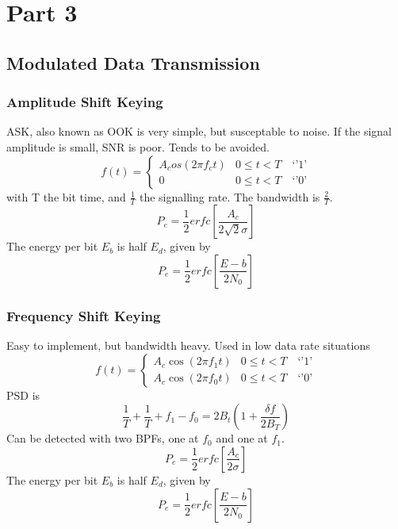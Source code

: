 \documentclass[a4paper,twocolumn]{article}
\begin{document}
	\section{Part 3}
		\subsection{Modulated Data Transmission}
			\subsubsection{Amplitude Shift Keying}
				ASK, also known as OOK is very simple, but susceptable to noise.
				If the signal amplitude is small, SNR is poor.
				Tends to be avoided.
				\begin{equation}
					f(t) = \begin{cases}
					A_cos(2\pi f_ct) & 0\le t < T \quad \text{`'1'}\\
								0 & 0\le t < T \quad \text{`'0'}
								\end{cases}
				\end{equation}
				with T the bit time, and $\frac{1}{T}$ the signalling rate.
				The bandwidth is $\frac{2}{T}$.
				\begin{equation}
					P_e = \frac{1}{2} erfc \left[ \frac{A_c}{2 \sqrt{2} \sigma}\right]
				\end{equation}
				The energy per bit $E_b$ is half $E_d$, given by
				\begin{equation}
					P_e = \frac{1}{2} erfc \left[ \frac{E-b}{2 N_0}\right]
				\end{equation}

			\subsubsection{Frequency Shift Keying}
				Easy to implement, but bandwidth heavy. Used in low data rate situations
				\begin{equation}
					f(t) = \begin{cases}
						A_c\cos(2\pi f_1t) & 0\le t < T \quad \text{`'1'}\\
						A_c\cos(2\pi f_0t) & 0\le t < T \quad \text{`'0'}
								\end{cases}
				\end{equation}
				PSD is
				\begin{equation}
					\frac{1}{T} + \frac{1}{T}+f_1-f_0 =
						2B_t\left( 1+ \frac{\delta f}{2 B_T} \right)
				\end{equation}
				Can be detected with two BPFs, one at $f_0$ and one at $f_1$.
				\begin{equation}
					P_e = \frac{1}{2} erfc \left[ \frac{A_c}{2\sigma}\right]
				\end{equation}
				The energy per bit $E_b$ is half $E_d$, given by
				\begin{equation}
					P_e = \frac{1}{2} erfc \left[ \frac{E-b}{2 N_0}\right]
				\end{equation}
\end{document}
